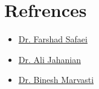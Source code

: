\documentclass[10pt,a4paper,sans]{moderncv} %
\begin{document}
	

	\section{Refrences}
	\begin{itemize}
    	\item \href{mailto:f_safaei@sbu.ac.ir}{Dr. Farshad Safaei}
    	\item \href{mailto:jahanian@sbu.ac.ir}{Dr. Ali Jahanian}
    	\item \href{mailto:marvasti@khu.ac.ir}{Dr. Binesh Marvasti}
	\end{itemize}
	
	
	\newpage
\end{document}
